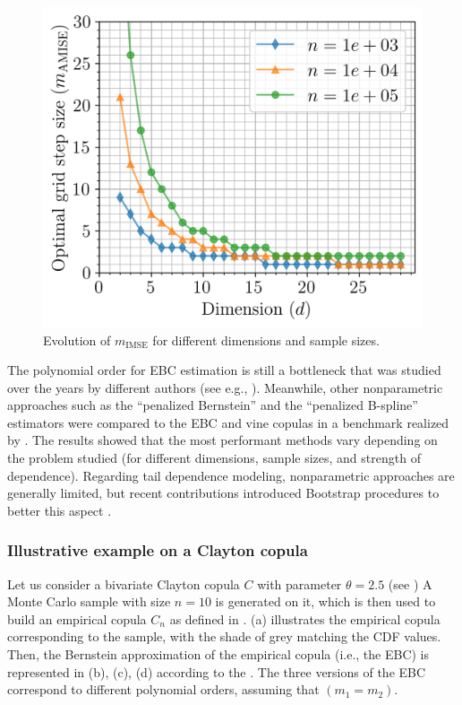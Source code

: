 \begin{figure}
    \centering
    \includegraphics[width=0.5\linewidth]{../numerical_experiments/chapter3/figures/hAMISE.png}
    \caption{Evolution of $m_{\mathrm{IMSE}}$ for different dimensions and sample sizes.}
    \label{fig:hmise}
\end{figure}

The polynomial order for EBC estimation is still a bottleneck that was studied over the years by different authors (see e.g., \citealt{janssen_2012_ebc,bouezmarni_2013_EBC_convergence,rose_2015,segers_2017}).  
Meanwhile, other nonparametric approaches such as the ``penalized Bernstein'' and the ``penalized B-spline'' estimators were compared to the EBC and vine copulas in a benchmark realized by \citet{nagler_2017}. 
The results showed that the most performant methods vary depending on the problem studied (for different dimensions, sample sizes, and strength of dependence). 
Regarding tail dependence modeling, nonparametric approaches are generally limited, but recent contributions introduced Bootstrap procedures to better this aspect \citep{kiriliouk_2021_resampling}.


\subsubsection{Illustrative example on a Clayton copula}
Let us consider a bivariate Clayton copula $C$ with parameter $\theta=2.5$ (see \citealt{nelsen_2006_copulas})
A Monte Carlo sample with size $n=10$ is generated on it, which is then used to build an empirical copula $C_n$ as defined in . 
 (a) illustrates the empirical copula corresponding to the sample, with the shade of grey matching the CDF values. 
Then, the Bernstein approximation of the empirical copula (i.e., the EBC)  is represented in  (b), (c), (d) according to the . 
The three versions of the EBC correspond to different polynomial orders, assuming that $(m_1=m_2)$. 

